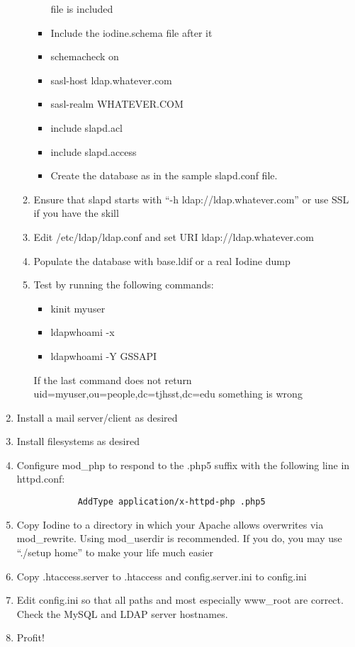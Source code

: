 \documentclass[11pt,letterpaper]{report}
\begin{document}
\begin{enumerate}
\begin{enumerate}
\begin{itemize}
						file is included
					\item Include the iodine.schema file
						after it
					\item schemacheck on
					\item sasl-host ldap.whatever.com
					\item sasl-realm WHATEVER.COM
					\item include slapd.acl
					\item include slapd.access
					\item Create the database as in
						the sample slapd.conf file.
				\end{itemize}
			\item Ensure that slapd starts with ``-h ldap://ldap.whatever.com''
				or use SSL if you have the skill
			\item Edit /etc/ldap/ldap.conf and set URI ldap://ldap.whatever.com
			\item Populate the database with base.ldif or a real Iodine dump
			\item Test by running the following commands:
				\begin{itemize}
					\item kinit myuser
					\item ldapwhoami -x
					\item ldapwhoami -Y GSSAPI
				\end{itemize}
				If the last command does not return
				uid=myuser,ou=people,dc=tjhsst,dc=edu something is wrong
		\end{enumerate}
	\item Install a mail server/client as desired
	\item Install filesystems as desired
	\item Configure mod\_php to respond to the .php5 suffix with the
		following line in httpd.conf:
		\begin{verbatim}
			AddType application/x-httpd-php .php5
		\end{verbatim}
	\item Copy Iodine to a directory in which your Apache allows
		overwrites via mod\_rewrite.  Using mod\_userdir is recommended.
		If you do, you may use ``./setup home'' to make your life much
		easier
	\item Copy .htaccess.server to .htaccess and config.server.ini to config.ini
	\item Edit config.ini so that all paths and most especially www\_root
		are correct.  Check the MySQL and LDAP server hostnames.
	\item Profit!
\end{enumerate}
\end{document}
